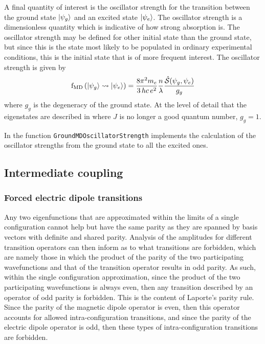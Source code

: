 \documentclass{article}
\newcommand{\codetext}[1]{{\color{BlueViolet} \texttt{#1}}}
\begin{document}
 
 
A final quantity of interest is the oscillator strength for the transition between the ground state $|\psi_g\rangle$ and an excited state $|\psi_e\rangle$. The oscillator strength is a dimensionless quantity which is indicative of how strong absorption is. The oscillator strength may be defined for other initial state than the ground state, but since this is the state most likely to be populated in ordinary experimental conditions, this is the initial state that is of more frequent interest. The oscillator strength is given by \cite{carnall_spectral_1965}
\begin{equation}
	\text{f}_\text{MD}\left(|\psi_g\rangle \rightsquigarrow |\psi_e\rangle\right) = \frac{8 \pi^2 m_{e}}{3\,hc\,e^2} 
	\frac{n}{\lambda}
	\frac{\hat{\mathcal{S}}(\psi_g,\psi_e)}{g_g}
\end{equation}
where $g_g$ is the degeneracy of the ground state. At the level of detail that the eigenstates are described in \qlanth where $J$ is no longer a good quantum number, $g_g = 1$. 

In \qlanth the function \codetext{GroundMDOscillatorStrength} implements the calculation of the oscillator strengths from the ground state to all the excited ones.

 

\subsection{Intermediate coupling}

\subsubsection{Forced electric dipole transitions}

Any two eigenfunctions that are approximated within the limits of a single configuration cannot help but have the same parity as they are spanned by basis vectors with definite and shared parity. Analysis of the amplitudes for different transition operators can then inform as to what transitions are forbidden, which are namely those in which the product of the parity of the two participating wavefunctions and that of the transition operator results in odd parity. As such, within the single configuration approximation, since the product of the two participating wavefunctions is always even, then any transition described by an operator of odd parity is forbidden. This is the content of Laporte's parity rule. Since the parity of the magnetic dipole operator is even, then this operator accounts for allowed intra-configuration transitions, and since the parity of the electric dipole operator is odd, then these types of intra-configuration transitions are forbidden.
\end{document}
